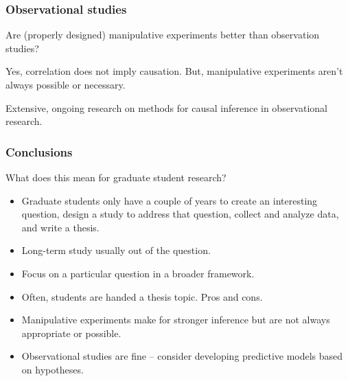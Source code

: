 \documentclass[color=usenames,dvipsnames]{beamer}\usepackage[]{graphicx}\usepackage[]{color}
\begin{document}
\begin{frame}
  \frametitle{Observational studies}
  Are (properly designed) manipulative experiments better than
  observation studies?

  Yes, correlation does not imply causation. But, manipulative
  experiments aren't always possible or necessary. 

  Extensive, ongoing research on methods for causal inference in
  observational research.
  
\end{frame}


\begin{frame}
  \frametitle{Conclusions}
  What does this mean for graduate student research?
  \begin{itemize}
    \item Graduate students only have a couple of years to create an
      interesting question, design a study to address that question,
      collect and analyze data, and write a thesis.
    \item Long-term study usually out of the question.
    \item Focus on a particular question in a
      broader framework.
    \item Often, students are handed a thesis topic. Pros and cons.
    \item Manipulative experiments make for stronger
      inference but are not always appropriate or possible.
    \item Observational studies are fine -- consider
      developing predictive models based on hypotheses.
  \end{itemize}
\end{frame}
\end{document}

